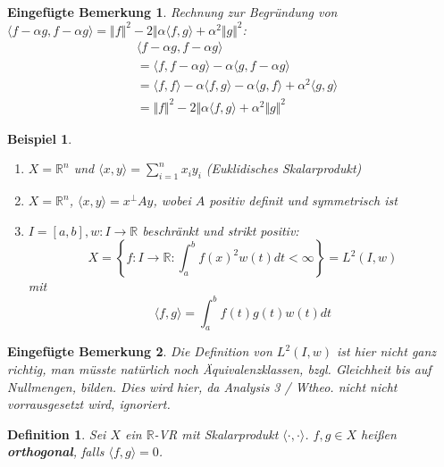 \documentclass{book}
\newtheorem{definition}[algorithm]{Definition}
\newtheorem*{mremark}{Eingefügte Bemerkung}
\newtheorem{example}[algorithm]{Beispiel}
\def\R{\mathbb{R}}
\begin{document}
            \begin{mremark}
                Rechnung zur Begründung von $ \langle f-\alpha g,f-\alpha g \rangle
                = \Vert f \Vert^2 -2 \Vert\alpha \langle f,g \rangle+\alpha^2 \Vert g \Vert^2$:
                \begin{align*}
                    &\langle f-\alpha g,f-\alpha g \rangle\\
                    &=\langle f,f-\alpha g \rangle-\alpha \langle g,f-\alpha g \rangle\\
                    &=\langle f,f \rangle-\alpha \langle f,g \rangle-\alpha \langle g,f \rangle+\alpha^2 \langle g,g \rangle\\
                    &=\Vert f \Vert^2 -2 \Vert\alpha \langle f,g \rangle+\alpha^2 \Vert g \Vert^2
                \end{align*}
            \end{mremark}
            \begin{example}\label{b1.5}
                \begin{enumerate}
                    \item $X=\R^n$ und $\langle x,y \rangle=\sum_{i=1}^n x_iy_i$ (Euklidisches Skalarprodukt)
                    \item $X=\R^n$, $\langle x,y \rangle=x^\perp A y$, wobei $A$ positiv definit und symmetrisch ist
                    \item $I=[a,b],w:I\to\R$ beschränkt und strikt positiv:
                        \begin{equation*}
                            X=\left\{f:I\to\R:\int_a^b f(x)^2w(t)dt<\infty\right\}=L^2(I,w)
                        \end{equation*}
                        mit 
                        \begin{equation*}
                            \langle f,g \rangle = \int_a^b f(t)g(t)w(t)dt
                        \end{equation*}
                \end{enumerate}
            \end{example}
            \begin{mremark}
                Die Definition von $L^2(I,w)$ ist hier nicht ganz richtig, man müsste natürlich noch Äquivalenzklassen, bzgl. Gleichheit bis auf Nullmengen, bilden. 
                Dies wird hier, da Analysis 3 / Wtheo. nicht nicht vorrausgesetzt wird, ignoriert.
            \end{mremark}
            \begin{definition}\label{d1.6}
                Sei $X$ ein $\R$-VR mit Skalarprodukt $\langle \cdot,\cdot \rangle$.
                $f,g\in X$ heißen \textbf{orthogonal}, falls $\langle f,g \rangle=0$.
            \end{definition}
\end{document}
